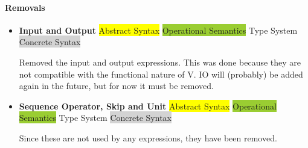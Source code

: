 \documentclass{article}
\begin{document}
\paragraph{Removals}

\begin{itemize}
  \item \textbf{Input and Output} \; \; {\small\colorbox{yellow}{Abstract Syntax} \colorbox{YellowGreen}{Operational Semantics} \colorbox{ProcessBlue}{Type System} \colorbox{lightgray}{Concrete Syntax}}

      Removed the input and output expressions.
      This was done because they are not compatible with the functional nature of V.
      IO will (probably) be added again in the future, but for now it must be removed.

  \item \textbf{Sequence Operator, Skip and Unit} \; \; {\small\colorbox{yellow}{Abstract Syntax} \colorbox{YellowGreen}{Operational Semantics} \colorbox{ProcessBlue}{Type System} \colorbox{lightgray}{Concrete Syntax}}

      Since these are not used by any expressions, they have been removed.
\end{itemize}
\end{document}
